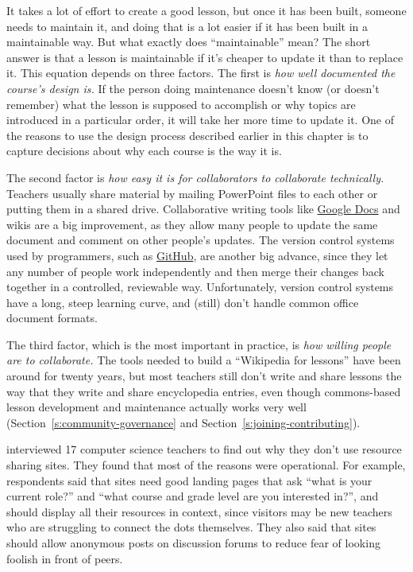 It takes a lot of effort to create a good lesson, but once it has been
built, someone needs to maintain it, and doing that is a lot easier if
it has been built in a maintainable way. But what exactly does
``maintainable'' mean? The short answer is that a lesson is maintainable
if it's cheaper to update it than to replace it. This equation depends
on three factors. The first is \emph{how well documented the course's
design is.} If the person doing maintenance doesn't know (or doesn't
remember) what the lesson is supposed to accomplish or why topics are
introduced in a particular order, it will take her more time to update
it. One of the reasons to use the design process described earlier in
this chapter is to capture decisions about why each course is the way
it is.

The second factor is \emph{how easy it is for collaborators to collaborate
technically.} Teachers usually share material by mailing PowerPoint
files to each other or putting them in a shared drive. Collaborative
writing tools like \href{http://docs.google.com}{Google Docs} and wikis are
a big improvement, as they allow many people to update the same
document and comment on other people's updates. The version control
systems used by programmers, such as \href{http://github.com}{GitHub}, are
another big advance, since they let any number of people work
independently and then merge their changes back together in a
controlled, reviewable way. Unfortunately, version control systems
have a long, steep learning curve, and (still) don't handle common
office document formats.

The third factor, which is the most important in practice, is \emph{how
willing people are to collaborate.} The tools needed to build a
``Wikipedia for lessons'' have been around for twenty years, but most
teachers still don't write and share lessons the way that they write
and share encyclopedia entries, even though commons-based lesson
development and maintenance actually works very well
(Section~\ref{s:community-governance} and
Section~\ref{s:joining-contributing}).

\cite{Leak2017} interviewed 17 computer science teachers to find
out why they don't use resource sharing sites. They found that most of
the reasons were operational. For example, respondents said that sites
need good landing pages that ask ``what is your current role?'' and
``what course and grade level are you interested in?'', and should
display all their resources in context, since visitors may be new
teachers who are struggling to connect the dots themselves. They also
said that sites should allow anonymous posts on discussion forums to
reduce fear of looking foolish in front of peers.

